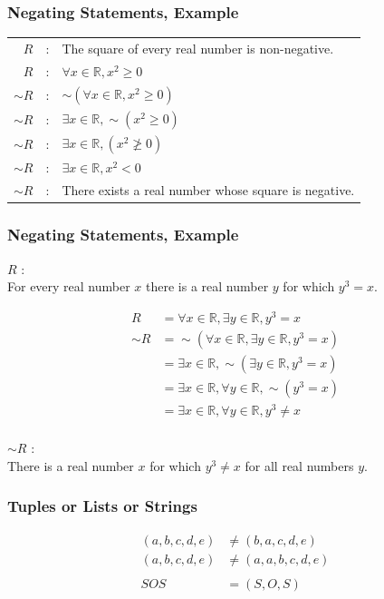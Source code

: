 \documentclass{beamer}
\renewcommand{\neg}{\sim}
\newcommand{\bfr}[1]{\begin{frame}[fragile]\frametitle{{ #1 }}}
\begin{document}
\bfr{Negating Statements, Example}
\begin{tabular}{rcl}
  $R$  &:& The square of every real number is non-negative.\\
  $R$  &:& $\forall x\in\mathbb{R}, x^2\geq 0$\\
  $\neg R$ &:&$\neg(\forall x\in\mathbb{R}, x^2\geq 0)$\\
  $\neg R$ &:&$\exists x\in\mathbb{R}, \neg(x^2\geq 0)$\\
  $\neg R$ &:&$\exists x\in\mathbb{R}, (x^2\not\geq 0)$\\
  $\neg R$ &:&$\exists x\in\mathbb{R}, x^2 < 0$\\
  $\neg R$ &:& There exists a real number whose square is negative.\\
\end{tabular}

\end{frame}

\bfr{Negating Statements, Example}

$R$ : \\
{For every real number $x$
    there is a real number $y$ 
    for  which $y^3 = x$.}  

\begin{align*}
  R &= \forall x\in\mathbb{R}, \exists y\in\mathbb{R}, y^3 = x\\
  \neg R
  &= \neg(\forall x\in\mathbb{R}, \exists y\in\mathbb{R}, y^3 =  x)\\
  &= \exists x\in\mathbb{R}, \neg(\exists y\in\mathbb{R}, y^3 =  x)\\
  &= \exists x\in\mathbb{R}, \forall y\in\mathbb{R}, \neg(y^3 =  x)\\
  &= \exists x\in\mathbb{R}, \forall y\in\mathbb{R}, y^3 \neq  x\\
\end{align*}

$\neg R$ : \\
There is a real number $x$ for which $y^3 \neq x$ for all real
numbers $y$.

\end{frame}


\bfr{Tuples or Lists or Strings}
\begin{align*}
  (a,b,c,d,e) &\neq (b,a,c,d,e)\\
  (a,b,c,d,e)  &\neq (a,a,b,c,d,e)\\\\
  SOS &= (S,O,S)\\
\end{align*}
\end{frame}
\end{document}
